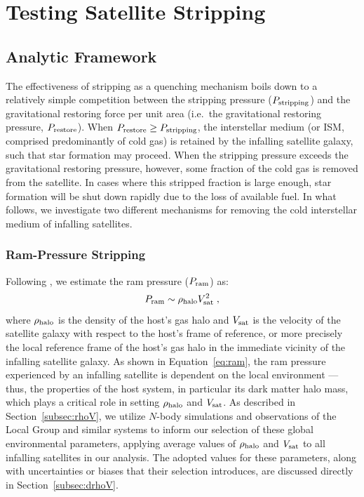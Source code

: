 \section{Testing Satellite Stripping}
\label{sec:rps}

\subsection{Analytic Framework}
\label{subsec:af}
The effectiveness of stripping as a quenching mechanism boils down to
a relatively simple competition between the stripping pressure
($P_{\rm stripping}$) and the gravitational restoring force per unit
area (i.e.~the gravitational restoring pressure, $P_{\rm restore}$).
%
When $P_{\rm restore} \ge P_{\rm stripping}$, the interstellar medium
(or ISM, comprised predominantly of cold gas) is retained by the
infalling satellite galaxy, such that star formation may proceed.
%
When the stripping pressure exceeds the gravitational restoring
pressure, however, some fraction of the cold gas is removed from the
satellite. In cases where this stripped fraction is large enough, star
formation will be shut down rapidly due to the loss of available fuel.
%
In what follows, we investigate two different mechanisms for removing
the cold interstellar medium of infalling satellites.
%

\subsubsection{Ram-Pressure Stripping}
%
Following \citet{gunn72}, we estimate the ram pressure ($P_{\rm ram}$)
as:
%
\begin{equation}
P_{\rm ram} \sim \rho_{\rm halo} V_{\rm sat}^{2} \; ,
\label{eq:ram}
\end{equation}
%
where $\rho_{\rm halo}$ is the density of the host's gas halo and
$V_{\rm sat}$ is the velocity of the satellite galaxy with respect to
the host's frame of reference, or more precisely the local reference
frame of the host's gas halo in the immediate vicinity of the
infalling satellite galaxy.
%
As shown in Equation~\ref{eq:ram}, the ram pressure experienced by an
infalling satellite is dependent on the local environment --- thus,
the properties of the host system, in particular its dark matter halo
mass, which plays a critical role in setting $\rho_{\rm halo}$ and
$V_{\rm sat}$.
% 
As described in Section~\ref{subsec:rhoV}, we utilize $N$-body
simulations and observations of the Local Group and similar systems to
inform our selection of these global environmental parameters,
applying average values of $\rho_{\rm halo}$ and $V_{\rm sat}$ to all
infalling satellites in our analysis.
%
The adopted values for these parameters, along with uncertainties or
biases that their selection introduces, are discussed directly in
Section~\ref{subsec:drhoV}.
%

